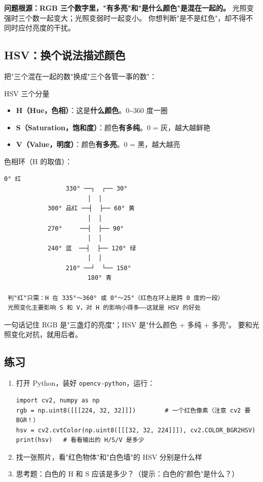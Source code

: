 \documentclass[11pt]{ctexart}
\newcommand{\code}[1]{\texttt{#1}}
\begin{document}
\textbf{问题根源：RGB 三个数字里，"有多亮"和"是什么颜色"是混在一起的。}
光照变强时三个数一起变大；光照变弱时一起变小。
你想判断"是不是红色"，却不得不同时应付亮度的干扰。

\subsection{HSV：换个说法描述颜色}

把"三个混在一起的数"换成"三个各管一事的数"：

\begin{keybox}{HSV 三个分量}
\begin{itemize}
  \item \textbf{H（Hue，色相）}：这是\textbf{什么颜色}。0\textasciitilde 360 度一圈
  \item \textbf{S（Saturation，饱和度）}：颜色\textbf{有多纯}。0 = 灰，越大越鲜艳
  \item \textbf{V（Value，明度）}：颜色\textbf{有多亮}。0 = 黑，越大越亮
\end{itemize}
\end{keybox}

色相环（H 的取值）：

\begin{Verbatim}[frame=single,fontsize=\small]
                        0° 红
                 330° ──┐  ┌── 30°
                       │  │
            300° 品红 ──┤  ├── 60° 黄
                       │  │
            270°     ──┤  ├── 90°
                       │  │
            240° 蓝  ──┤  ├── 120° 绿
                       │  │
                 210° ──┘  └── 150°
                       180° 青

 判"红"只需：H 在 335°～360° 或 0°～25°（红色在环上是跨 0 度的一段）
 光照变化主要影响 S 和 V，对 H 的影响小得多——这就是 HSV 的好处
\end{Verbatim}

\begin{tipbox}{一句话记住}
RGB 是"三盏灯的亮度"；HSV 是"什么颜色 + 多纯 + 多亮"。
要和光照变化对抗，就用后者。
\end{tipbox}

\subsection{练习}

\begin{enumerate}
  \item 打开 Python，装好 \code{opencv-python}，运行：
\begin{Verbatim}[fontsize=\small]
import cv2, numpy as np
rgb = np.uint8([[[224, 32, 32]]])        # 一个红色像素（注意 cv2 要 BGR！）
hsv = cv2.cvtColor(np.uint8([[[32, 32, 224]]]), cv2.COLOR_BGR2HSV)
print(hsv)   # 看看输出的 H/S/V 是多少
\end{Verbatim}
  \item 找一张照片，看"红色物体"和"白色墙"的 HSV 分别是什么样
  \item 思考题：白色的 H 和 S 应该是多少？（提示：白色的"颜色"是什么？）
\end{enumerate}
\end{document}
